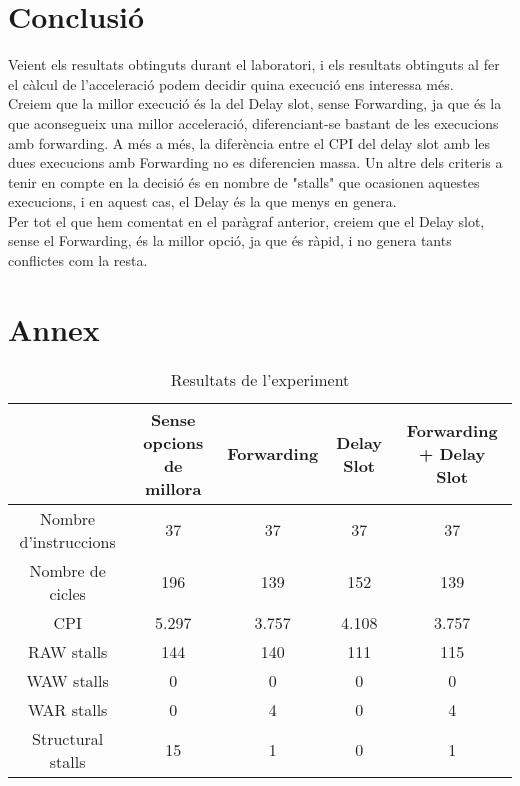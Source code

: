 \documentclass{article}
\begin{document}
\section{Conclusió}
Veient els resultats obtinguts durant el laboratori, i els resultats obtinguts al fer el càlcul de l'acceleració podem decidir quina execució ens interessa més.\\
Creiem que la millor execució és la del Delay slot, sense Forwarding, ja que és la que aconsegueix una millor acceleració, diferenciant-se bastant de les execucions amb forwarding. A més a més, la diferència entre el CPI del delay slot amb les dues execucions amb Forwarding no es diferencien massa. Un altre dels criteris a tenir en compte en la decisió és en nombre de "stalls" que ocasionen aquestes execucions, i en aquest cas, el Delay és la que menys en genera.\\
Per tot el que hem comentat en el paràgraf anterior, creiem que el Delay slot, sense el Forwarding, és la millor opció, ja que és ràpid, i no genera tants conflictes com la resta.

\newpage
\section{Annex}

\begin{table}[!h]
\centering
\begin{tabular}{|c|c|c|c|c|}
\hline
 & Sense opcions de millora &Forwarding  &Delay Slot  &Forwarding + Delay Slot   \\
 \hline
 Nombre d'instruccions &37  &37  &37 &37  \\
 \hline
 Nombre de cicles &196               &139  &152  &139   \\
 \hline
 CPI &5.297               &3.757  &4.108  &3.757   \\
 \hline
 RAW stalls &144 &140  &111  &115   \\
 \hline
 WAW stalls &0 &0 &0 &0   \\
 \hline
 WAR stalls &0 &4 &0 &4   \\
 \hline
 Structural stalls &15 &1 &0 &1\\
 \hline 
\end{tabular}
\caption{Resultats de l'experiment}
\label{tab:results}
\end{table}
\end{document}
